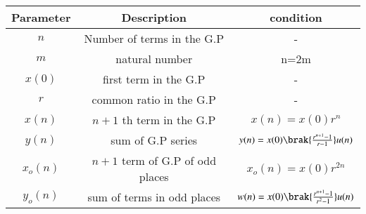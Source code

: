 
\begin{tabular}{|c|c|c|}
\hline
Parameter & Description & condition\\
\hline
\( n \) & Number of terms in the G.P & - \\
\hline
\( m \) & natural number & n=2m \\
\hline
\(x(0) \) & first term in the G.P & -\\
\hline
\( r \) & common ratio in the G.P & - \\
\hline
\( x(n) \) & $n+1$ th term in the G.P & $x(n)=x(0)r^{n}$\\
\hline
\( y(n) \) & sum of G.P series & $y(n)=x(0)\brak{\frac{r^{n+1}-1}{r-1}}u(n)$\\
\hline
\( x_o(n) \) & $n+1$ term of G.P of odd places & $x_o(n)= x(0)r^{2n}$\\
\hline
\( y_o(n) \) & sum of terms in odd places & $w(n)=x(0)\brak{\frac{r^{n+1}-1}{r^2-1}}u(n)$\\
\hline
\end{tabular}



